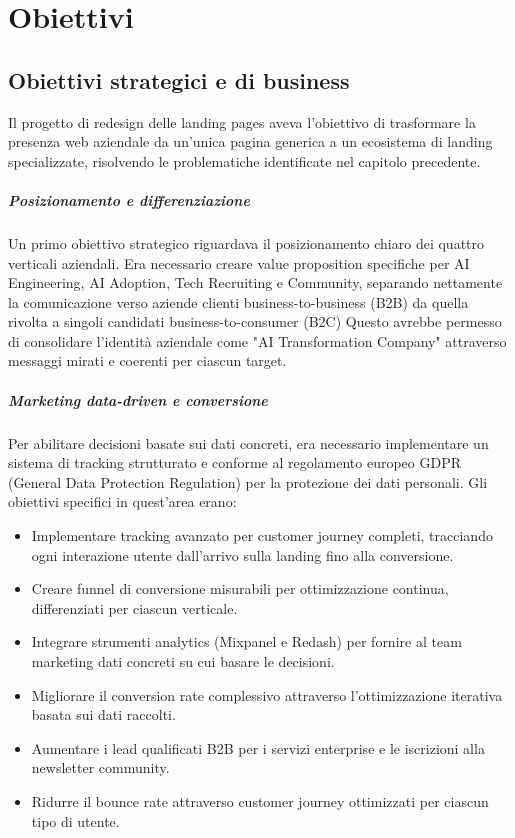 \chapter{Obiettivi}

\section{Obiettivi strategici e di business}
Il progetto di redesign delle landing pages aveva l'obiettivo di 
trasformare la presenza web aziendale da un'unica pagina generica a un 
ecosistema di landing specializzate, risolvendo le problematiche 
identificate nel capitolo precedente.

\paragraph{Posizionamento e differenziazione}
Un primo obiettivo strategico riguardava il posizionamento chiaro dei 
quattro verticali aziendali. Era necessario creare value proposition 
specifiche per AI Engineering, AI Adoption, Tech Recruiting e Community, 
separando nettamente la comunicazione verso aziende clienti 
business-to-business (B2B) da quella rivolta a singoli 
candidati business-to-consumer (B2C)
Questo avrebbe permesso di consolidare l'identità aziendale come 
"AI Transformation Company" attraverso messaggi mirati e coerenti per 
ciascun target.

\paragraph{Marketing data-driven e conversione}
Per abilitare decisioni basate sui dati concreti, era necessario 
implementare un sistema di tracking strutturato e conforme al regolamento 
europeo GDPR (General Data Protection Regulation) per la protezione dei 
dati personali. Gli obiettivi specifici in quest'area erano:

\begin{itemize}
  \item Implementare tracking avanzato per customer journey completi, 
        tracciando ogni interazione utente dall'arrivo sulla landing 
        fino alla conversione.
  
  \item Creare funnel di conversione misurabili per ottimizzazione 
        continua, differenziati per ciascun verticale.
  
  \item Integrare strumenti analytics (Mixpanel e Redash) per fornire 
        al team marketing dati concreti su cui basare le decisioni.
  
  \item Migliorare il conversion rate complessivo attraverso 
        l'ottimizzazione iterativa basata sui dati raccolti.
  
  \item Aumentare i lead qualificati B2B per i servizi enterprise e 
        le iscrizioni alla newsletter community.
  
  \item Ridurre il bounce rate attraverso customer journey ottimizzati 
        per ciascun tipo di utente.
\end{itemize}

